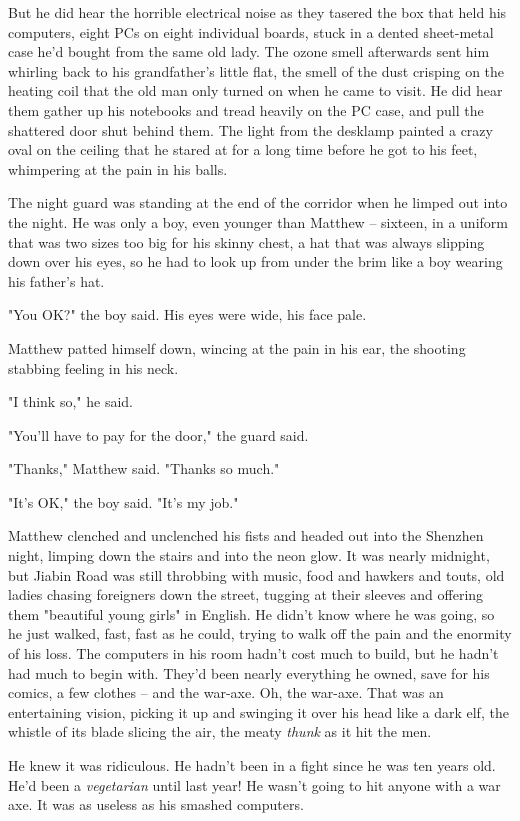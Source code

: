 But he did hear the horrible electrical noise as they tasered the
box that held his computers, eight PCs on eight individual boards,
stuck in a dented sheet-metal case he'd bought from the same old
lady. The ozone smell afterwards sent him whirling back to his
grandfather's little flat, the smell of the dust crisping on the
heating coil that the old man only turned on when he came to visit.
He did hear them gather up his notebooks and tread heavily on the
PC case, and pull the shattered door shut behind them. The light
from the desklamp painted a crazy oval on the ceiling that he
stared at for a long time before he got to his feet, whimpering at
the pain in his balls.

The night guard was standing at the end of the corridor when he
limped out into the night. He was only a boy, even younger than
Matthew -- sixteen, in a uniform that was two sizes too big for his
skinny chest, a hat that was always slipping down over his eyes, so
he had to look up from under the brim like a boy wearing his
father's hat.

"You OK?" the boy said. His eyes were wide, his face pale.

Matthew patted himself down, wincing at the pain in his ear, the
shooting stabbing feeling in his neck.

"I think so," he said.

"You'll have to pay for the door," the guard said.

"Thanks," Matthew said. "Thanks so much."

"It's OK," the boy said. "It's my job."

Matthew clenched and unclenched his fists and headed out into the
Shenzhen night, limping down the stairs and into the neon glow. It
was nearly midnight, but Jiabin Road was still throbbing with
music, food and hawkers and touts, old ladies chasing foreigners
down the street, tugging at their sleeves and offering them
"beautiful young girls" in English. He didn't know where he was
going, so he just walked, fast, fast as he could, trying to walk
off the pain and the enormity of his loss. The computers in his
room hadn't cost much to build, but he hadn't had much to begin
with. They'd been nearly everything he owned, save for his comics,
a few clothes -- and the war-axe. Oh, the war-axe. That was an
entertaining vision, picking it up and swinging it over his head
like a dark elf, the whistle of its blade slicing the air, the
meaty \emph{thunk} as it hit the men.

He knew it was ridiculous. He hadn't been in a fight since he was
ten years old. He'd been a \emph{vegetarian} until last year! He
wasn't going to hit anyone with a war axe. It was as useless as his
smashed computers.

